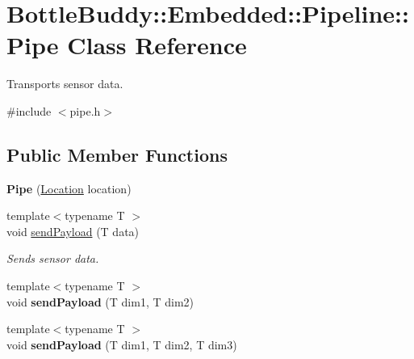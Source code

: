 \hypertarget{class_bottle_buddy_1_1_embedded_1_1_pipeline_1_1_pipe}{}\section{Bottle\+Buddy\+:\+:Embedded\+:\+:Pipeline\+:\+:Pipe Class Reference}
\label{class_bottle_buddy_1_1_embedded_1_1_pipeline_1_1_pipe}


Transports sensor data.  




{\ttfamily \#include $<$pipe.\+h$>$}

\subsection*{Public Member Functions}
\begin{DoxyCompactItemize}
\item 
{\bfseries Pipe} (\hyperlink{package_8h_aea2eca0caf9ed97414998f1a2f404682}{Location} location)\hypertarget{class_bottle_buddy_1_1_embedded_1_1_pipeline_1_1_pipe_a74724b71f6b5c7860c0111040b548244}{}\label{class_bottle_buddy_1_1_embedded_1_1_pipeline_1_1_pipe_a74724b71f6b5c7860c0111040b548244}

\item 
{\footnotesize template$<$typename T $>$ }\\void \hyperlink{class_bottle_buddy_1_1_embedded_1_1_pipeline_1_1_pipe_a4f344a817c439a96e28d1a226de4054b}{send\+Payload} (T data)
\begin{DoxyCompactList}\small\item\em Sends sensor data. \end{DoxyCompactList}\item 
{\footnotesize template$<$typename T $>$ }\\void {\bfseries send\+Payload} (T dim1, T dim2)\hypertarget{class_bottle_buddy_1_1_embedded_1_1_pipeline_1_1_pipe_a8007c53c651b37348f010c879e8ca42a}{}\label{class_bottle_buddy_1_1_embedded_1_1_pipeline_1_1_pipe_a8007c53c651b37348f010c879e8ca42a}

\item 
{\footnotesize template$<$typename T $>$ }\\void {\bfseries send\+Payload} (T dim1, T dim2, T dim3)\hypertarget{class_bottle_buddy_1_1_embedded_1_1_pipeline_1_1_pipe_a8f670b3591991a5afbae53d4ab5bc202}{}\label{class_bottle_buddy_1_1_embedded_1_1_pipeline_1_1_pipe_a8f670b3591991a5afbae53d4ab5bc202}

\end{DoxyCompactItemize}


